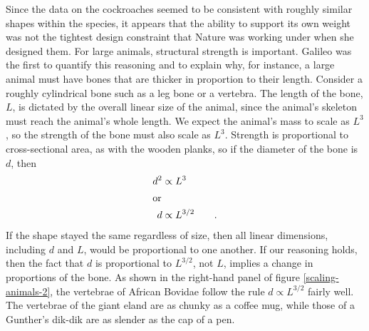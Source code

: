 Since the data on the cockroaches seemed to be consistent
with roughly similar shapes within the species, it appears
that the ability to support its own weight was not the
tightest design constraint that Nature was working under
when she designed them. For large animals, structural
strength is important. Galileo was the first to quantify
this reasoning and to explain why, for instance, a large
animal must have bones that are thicker in proportion to
their length. Consider a roughly cylindrical bone such as a
leg bone or a vertebra. The length of the
bone, $L$, is dictated by the overall linear size of the
animal, since the animal's skeleton must reach the animal's
whole length. We expect the animal's mass to scale as $L^3$,
so the strength of the bone must also scale as $L^3$.
Strength is proportional to cross-sectional area, as with
the wooden planks, so if the diameter of the bone is $d$, then
\begin{align*}
 d^2 &\propto L^3 \\
\intertext{or}
 d &\propto L^{3/2} \qquad .
\end{align*}
If the shape stayed the same regardless of size, then all
linear dimensions, including $d$ and $L$, would be
proportional to one another. If our reasoning holds, then
the fact that $d$ is proportional to $L^{3/2}$, not $L$, implies
a change in proportions of the bone. As shown in the right-hand
panel of figure \ref{scaling-animals-2},
the vertebrae of African Bovidae
follow the rule $d\propto L^{3/2}$ fairly well. The vertebrae
of the giant eland are as chunky as a coffee mug, while
those of a Gunther's dik-dik are as slender as the cap of a pen.







